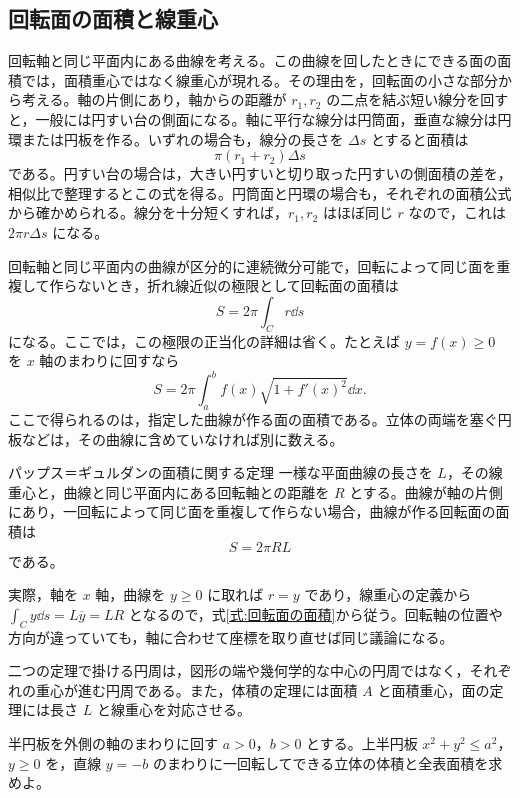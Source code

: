 \subsection{回転面の面積と線重心}

回転軸と同じ平面内にある曲線を考える。この曲線を回したときにできる面の面積では，面積重心ではなく線重心が現れる。その理由を，回転面の小さな部分から考える。軸の片側にあり，軸からの距離が $r_1,r_2$ の二点を結ぶ短い線分を回すと，一般には円すい台の側面になる。軸に平行な線分は円筒面，垂直な線分は円環または円板を作る。いずれの場合も，線分の長さを $\Delta s$ とすると面積は
\[
\pi(r_1+r_2)\Delta s
\]
である。円すい台の場合は，大きい円すいと切り取った円すいの側面積の差を，相似比で整理するとこの式を得る。円筒面と円環の場合も，それぞれの面積公式から確かめられる。線分を十分短くすれば，$r_1,r_2$ はほぼ同じ $r$ なので，これは $2\pi r\Delta s$ になる。

回転軸と同じ平面内の曲線が区分的に連続微分可能で，回転によって同じ面を重複して作らないとき，折れ線近似の極限として回転面の面積は
\begin{equation}\label{式:回転面の面積}
S=2\pi\int_C r\dd s
\end{equation}
になる。ここでは，この極限の正当化の詳細は省く。たとえば $y=f(x)\geq0$ を $x$ 軸のまわりに回すなら
\[
S=2\pi\int_a^b f(x)\sqrt{1+f'(x)^2}\dd x.
\]
ここで得られるのは，指定した曲線が作る面の面積である。立体の両端を塞ぐ円板などは，その曲線に含めていなければ別に数える。

\begin{theorem}{パップス＝ギュルダンの面積に関する定理}
一様な平面曲線の長さを $L$，その線重心と，曲線と同じ平面内にある回転軸との距離を $R$ とする。曲線が軸の片側にあり，一回転によって同じ面を重複して作らない場合，曲線が作る回転面の面積は
\[
S=2\pi R L
\]
である。
\end{theorem}

実際，軸を $x$ 軸，曲線を $y\geq0$ に取れば $r=y$ であり，線重心の定義から $\int_C y\dd s=L\overline y=LR$ となるので，式\eqref{式:回転面の面積}から従う。回転軸の位置や方向が違っていても，軸に合わせて座標を取り直せば同じ議論になる。

二つの定理で掛ける円周は，図形の端や幾何学的な中心の円周ではなく，それぞれの重心が進む円周である。また，体積の定理には面積 $A$ と面積重心，面の定理には長さ $L$ と線重心を対応させる。

\begin{example}{半円板を外側の軸のまわりに回す}
$a>0$，$b>0$ とする。上半円板 $x^2+y^2\leq a^2$，$y\geq0$ を，直線 $y=-b$ のまわりに一回転してできる立体の体積と全表面積を求めよ。
\end{example}

